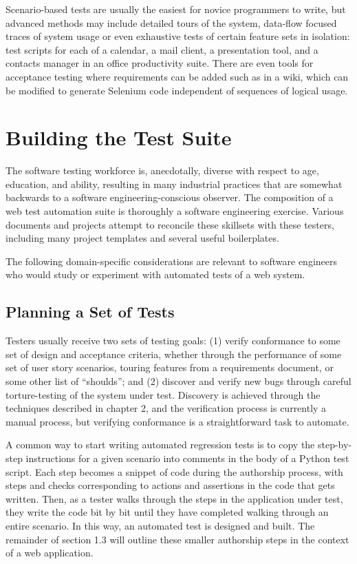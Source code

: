 Scenario-based tests are usually the easiest for novice programmers to write, but advanced methods may include detailed tours of the system, data-flow focused traces of system usage\citep{liu2000object} or even exhaustive tests of certain feature sets in isolation: test scripts for each of a calendar, a mail client, a presentation tool, and a contacts manager in an office productivity suite. There are even tools for acceptance testing where requirements can be added such as in a wiki, which can be modified to generate Selenium code independent of sequences of logical usage.\citep{wang2009build}

\section{Building the Test Suite}
The software testing workforce is, anecdotally, diverse with respect to age, education, and ability, resulting in many industrial practices that are somewhat backwards to a software engineering-conscious observer. The composition of a web test automation suite is thoroughly a software engineering exercise. Various documents and projects attempt to reconcile these skillsets with these testers, including many project templates and several useful boilerplates. \citep{GitHubma29}

The following domain-specific considerations are relevant to software engineers who would study or experiment with automated tests of a web system.

\subsection{Planning a Set of Tests}
Testers usually receive two sets of testing goals: (1) verify conformance to some set of design and acceptance criteria, whether through the performance of some set of user story scenarios, touring features from a requirements document, or some other list of ``shoulds''; and (2) discover and verify new bugs through careful torture-testing of the system under test. Discovery is achieved through the techniques described in chapter 2, and the verification process is currently a manual process, but verifying conformance is a straightforward task to automate.

A common way to start writing automated regression tests is to copy the step-by-step instructions for a given scenario into comments in the body of a Python test script. Each step becomes a snippet of code during the authorship process, with steps and checks corresponding to actions and assertions in the code that gets written. Then, as a tester walks through the steps in the application under test, they write the code bit by bit until they have completed walking through an entire scenario. In this way, an automated test is designed and built.\citep{nguyen2001testing} The remainder of section 1.3 will outline these smaller authorship steps in the context of a web application.

